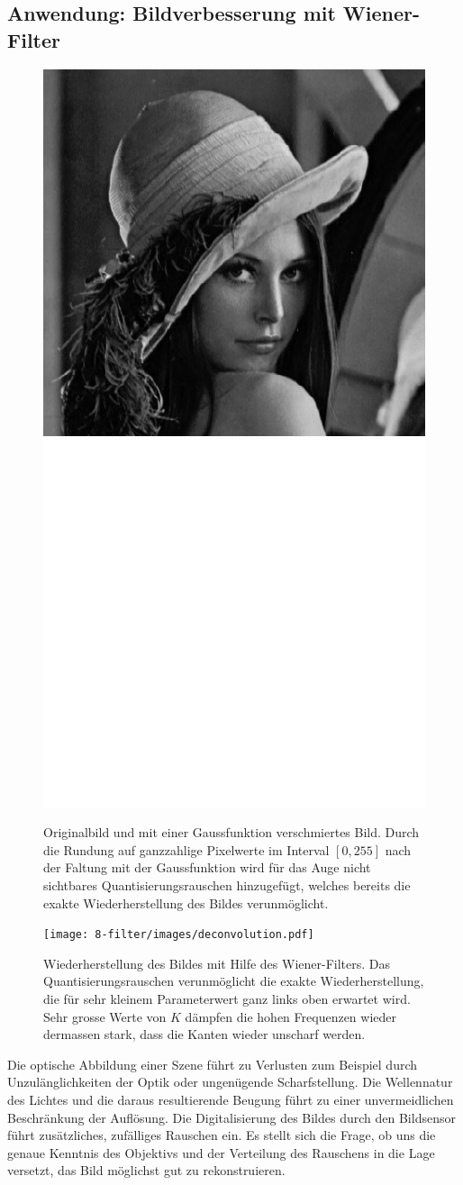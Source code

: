\subsection{Anwendung: Bildverbesserung mit Wiener-Filter
\label{filter:wiener:subsection:bildverbesserung}}
\begin{figure}
\centering
\includegraphics[width=0.48\hsize]{8-filter/images/lena.jpg}
\quad
\includegraphics[width=0.48\hsize]{8-filter/images/lena-noisy.png}
\caption{Originalbild und mit einer Gaussfunktion verschmiertes Bild.
Durch die Rundung auf ganzzahlige Pixelwerte im Interval $[0,255]$
nach der Faltung mit der Gaussfunktion wird für das Auge nicht
sichtbares Quantisierungsrauschen hinzugefügt, welches bereits die
exakte Wiederherstellung des Bildes verunmöglicht.
\label{filter:wiener:figure:faltung}}
\end{figure}
\begin{figure}
\centering
\texttt{[image: 8-filter/images/deconvolution.pdf]}
\caption{Wiederherstellung des Bildes mit Hilfe des Wiener-Filters.
Das Quantisierungsrauschen verunmöglicht die exakte Wiederherstellung,
die für sehr kleinem Parameterwert ganz links oben erwartet wird.
Sehr grosse Werte von $K$ dämpfen die hohen Frequenzen wieder dermassen
stark, dass die Kanten wieder unscharf werden.
\label{filter:wiener:figure:wiederherstellung}}
\end{figure}
Die optische Abbildung einer Szene führt zu Verlusten zum Beispiel
durch Unzulänglichkeiten der Optik oder ungenügende Scharfstellung.
Die Wellennatur des Lichtes und die daraus resultierende
Beugung führt zu einer unvermeidlichen Beschränkung der Auflösung.
Die Digitalisierung des Bildes durch den Bildsensor führt zusätzliches,
zufälliges Rauschen ein.
Es stellt sich die Frage, ob uns die genaue Kenntnis des Objektivs und der
Verteilung des Rauschens in die Lage versetzt, das Bild möglichst
gut zu rekonstruieren.

